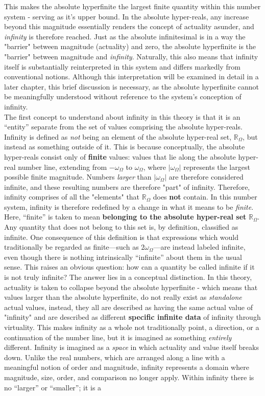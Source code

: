 \documentclass{article}
\begin{document}
This makes the absolute hyperfinite the largest finite quantity within this number system - serving as it's upper bound. In the absolute hyper-reals, any increase beyond this magnitude essentially renders the concept of actuality asunder, and  \textit{infinity} is therefore reached. Just as the absolute infinitesimal is in a way the "barrier" between magnitude (actuality) and zero, the absolute hyperfinite is the "barrier" between magnitude and \textit{infinity}. Naturally, this also means that infinity itself is substantially reinterpreted in this system and differs markedly from conventional notions. Although this interpretation will be examined in detail in a later chapter, this brief discussion is necessary, as the absolute hyperfinite cannot be meaningfully understood without reference to the system’s conception of infinity. \\ The first concept to understand about infinity in this theory is that it is an ``entity'' separate from the set of values comprising the absolute hyper-reals. Infinity is defined as \textit{not} being an element of the absolute hyper-real set, $\mathbb{R}_\Omega$, but instead as something outside of it. This is because conceptually, the absolute hyper-reals consist only of \textbf{finite} values: values that lie along the absolute hyper-real number line, extending from $-\omega_\Omega$ to $\omega_\Omega$, where $|\omega_\Omega|$ represents the largest possible finite magnitude. Numbers \textit{larger} than $|\omega_\Omega|$ are therefore considered infinite, and these resulting numbers are therefore "part" of infinity. Therefore, infinity comprises of all the "elements" that $\mathbb{R}_\Omega$ does \textbf{not} contain. In this number system, infinity is therefore redefined by a change in what it means to be \textit{finite}. Here, ``finite'' is taken to mean \textbf{belonging to the absolute hyper-real set} $\mathbb{R}_\Omega$. Any quantity that does not belong to this set is, by definition, classified as infinite. One consequence of this definition is that expressions which would traditionally be regarded as finite---such as $2\omega_\Omega$---are instead labeled infinite, even though there is nothing intrinsically ``infinite'' about them in the usual sense. This raises an obvious question: how can a quantity be called infinite if it is not truly infinite? The answer lies in a conceptual distinction. In this theory, actuality is taken to collapse beyond the absolute hyperfinite - which means that values larger than the absolute hyperfinite, do not really exist as \textit{standalone} actual values, instead, they all are described as having the same actual value of "infinity" and are described as different \textbf{specific infinite data} of infinity through virtuality. This makes infinity as a whole not traditionally point, a direction, or a continuation of the number line, but it is imagined as something \textit{entirely} different. Infinity is imagined as a \textit{space} in which actuality and value itself breaks down. Unlike the real numbers, which are arranged along a line with a meaningful notion of order and magnitude, infinity represents a domain where magnitude, size, order, and comparison no longer apply. Within infinity there is no ``larger'' or ``smaller''; it is a 
\end{document}
